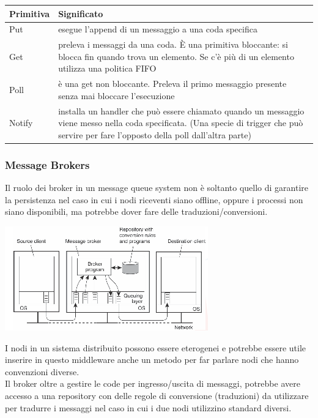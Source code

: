\begin{table}[!h]
    \centering
    \begin{tabular}{|p{}|p{}|}
        \hline
         Primitiva & Significato \\
        \hline
          Put & esegue l'append di un messaggio a una coda specifica \\ 
          \hline
          Get & preleva i messaggi da una coda. È una primitiva bloccante: si blocca fin quando trova un elemento. Se c'è più di un elemento utilizza una politica FIFO\\
          \hline
          Poll & è una get non bloccante. Preleva il primo messaggio presente senza mai bloccare l'esecuzione\\ 
           \hline
          Notify & installa un handler che può essere chiamato quando un messaggio viene messo nella coda specificata. (Una specie di trigger che può servire per fare l'opposto della poll dall'altra parte) \\ 
        \hline
    \end{tabular}
\end{table}


\subsubsection{Message Brokers}
Il ruolo dei broker in un message queue system non è soltanto quello di garantire la persistenza nel caso in cui i nodi riceventi siano offline, oppure i processi non siano disponibili, ma potrebbe dover fare delle traduzioni/conversioni. \\
\begin{center}
    \includegraphics[width = .7\textwidth]{images/lezione3/broker.png}
\end{center}
I nodi in un sistema distribuito possono essere eterogenei e potrebbe essere utile inserire in questo middleware anche un metodo per far parlare nodi che hanno convenzioni diverse.\\
Il broker oltre a gestire le code per ingresso/uscita di messaggi, potrebbe avere accesso a una repository con delle regole di conversione (traduzioni) da utilizzare per tradurre i messaggi nel caso in cui i due nodi utilizzino standard diversi.\\

